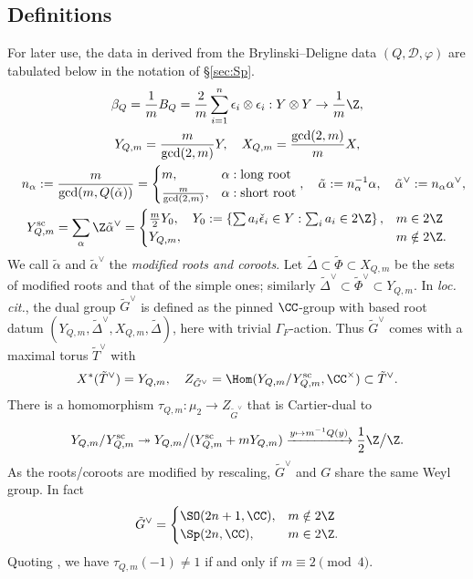 \documentclass[a4paper,10pt]{article}
\begin{document}
\subsection{Definitions}\label{sec:L-group}
For later use, the data in \cite[\S 2.2]{Weis17} derived from the Brylinski--Deligne data $(Q,\mathcal{D},\varphi)$ are tabulated below in the notation of \S\ref{sec:Sp}. 
\begin{gather*}
	\beta_Q = \frac{1}{m} B_Q = \frac{2}{m}\sum_{i=1}^n \epsilon_i \otimes \epsilon_i: Y \otimes Y \to \frac{1}{m}\Z, \\
	Y_{Q,m} = \frac{m}{\text{gcd}(2,m)} Y, \quad X_{Q,m} = \frac{\text{gcd}(2,m)}{m}  X, \\
	\quad n_\alpha := \frac{m}{\text{gcd}(m, Q(\check{\alpha}))} = \begin{cases}
		m, & \alpha: \text{long root} \\
		\frac{m}{\text{gcd}(2,m)}, & \alpha: \text{short root}
	\end{cases}, \quad \tilde{\alpha} := n_\alpha^{-1} \alpha, \quad \tilde{\alpha}^\vee := n_\alpha \alpha^\vee, \\
	Y_{Q,m}^\text{sc} = \sum_\alpha \Z\tilde{\alpha}^\vee = \begin{cases}
	\frac{m}{2} Y_0, \quad Y_0 := \left\{ \sum a_i \check{\epsilon}_i \in Y: \sum_i a_i \in 2\Z \right\}, & m \in 2\Z \\
	Y_{Q,m}, & m \notin 2\Z.
	\end{cases}
\end{gather*} 
We call $\tilde{\alpha}$ and $\tilde{\alpha}^\vee$ the \emph{modified roots and coroots}. Let $\tilde{\Delta} \subset \tilde{\Phi} \subset X_{Q,m}$ be the sets of modified roots and that of the simple ones; similarly $\tilde{\Delta}^\vee \subset \tilde{\Phi}^\vee \subset Y_{Q,m}$. In \textit{loc. cit.}, the dual group $\tilde{G}^\vee$ is defined as the pinned $\CC$-group with based root datum $(Y_{Q,m}, \tilde{\Delta}^\vee, X_{Q,m}, \tilde{\Delta})$, here with trivial $\Gamma_F$-action. Thus $\tilde{G}^\vee$ comes with a maximal torus $\tilde{T}^\vee$ with
\[ X^*(\tilde{T}^\vee) = Y_{Q,m}, \quad Z_{\tilde{G}^\vee} = \Hom(Y_{Q,m}/Y_{Q,m}^\text{sc}, \CC^\times) \subset \tilde{T}^\vee. \]
There is a homomorphism $\tau_{Q,m}: \mu_2 \to Z_{\tilde{G}^\vee}$ that is Cartier-dual to
\[ Y_{Q,m}/Y_{Q,m}^\text{sc} \twoheadrightarrow Y_{Q,m}\big/(Y_{Q,m}^\text{sc} + mY_{Q,m}) \xrightarrow{y \mapsto m^{-1}Q(y)} \frac{1}{2}\Z \big/ \Z. \]
As the roots/coroots are modified by rescaling, $\tilde{G}^\vee$ and $G$ share the same Weyl group. In fact
\[ \tilde{G}^\vee = \begin{cases}
	\SO(2n+1, \CC), & m \notin 2\Z \\
	\Sp(2n, \CC), & m \in 2\Z.
\end{cases}\]
Quoting \cite[\S 2.7.4]{Weis17}, we have $\tau_{Q,m}(-1) \neq 1$ if and only if $m \equiv 2 \pmod 4$. 
\end{document}
